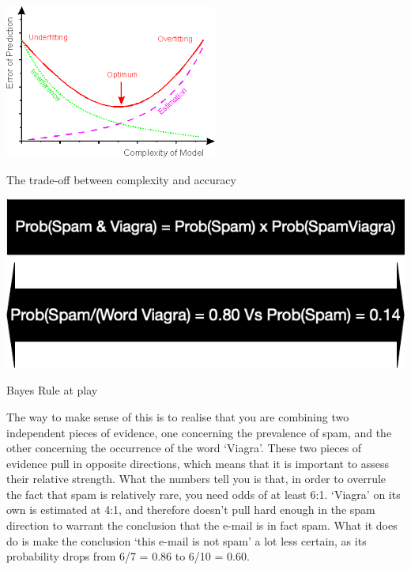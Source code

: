 \documentclass{tufte-handout}
\begin{document}
\begin{marginfigure}%
  \includegraphics[width=\linewidth]{tradeofffitting.png}
  \caption{The trade-off between complexity and accuracy}
  \label{fig:marginfig}
\end{marginfigure}
\begin{marginfigure}%
  \includegraphics[width=\linewidth]{Bayes.png}
  \caption{Bayes Rule at play}
  \label{fig:marginfig}
\end{marginfigure}
The way to make sense of this is to realise that you are combining two independent pieces of evidence, one concerning the prevalence of spam, and the other concerning the occurrence of the word ‘Viagra’. These two pieces of evidence pull in opposite directions, which means that it is important to assess their relative strength. What the numbers tell you is that, in order to overrule the fact that spam is relatively rare, you need odds of at least 6:1. ‘Viagra’ on its own is estimated at 4:1, and therefore doesn’t pull hard enough in the spam direction to warrant the conclusion that the e-mail is in fact spam. What it does do is make the conclusion ‘this e-mail is not spam’ a lot less certain, as its probability drops from 6/7 = 0.86 to 6/10 = 0.60.
\end{document}
